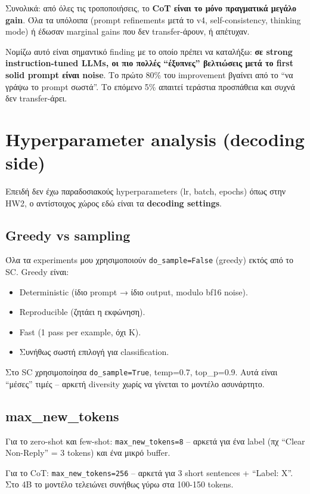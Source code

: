 \documentclass[12pt]{fphw}
\begin{document}
Συνολικά: από όλες τις τροποποιήσεις, το \textbf{CoT είναι το μόνο πραγματικά μεγάλο gain}. Όλα τα υπόλοιπα (prompt refinements μετά το v4, self-consistency, thinking mode) ή έδωσαν marginal gains που δεν transfer-άρουν, ή απέτυχαν.

Νομίζω αυτό είναι σημαντικό finding με το οποίο πρέπει να καταλήξω: \textbf{σε strong instruction-tuned LLMs, οι πιο πολλές ``έξυπνες'' βελτιώσεις μετά το first solid prompt είναι noise}. Το πρώτο 80\% του improvement βγαίνει από το ``να γράψω το prompt σωστά''. Το επόμενο 5\% απαιτεί τεράστια προσπάθεια και συχνά δεν transfer-άρει.

\section{Hyperparameter analysis (decoding side)}

Επειδή δεν έχω παραδοσιακούς hyperparameters (lr, batch, epochs) όπως στην HW2, ο αντίστοιχος χώρος εδώ είναι τα \textbf{decoding settings}.

\subsection{Greedy vs sampling}

Όλα τα experiments μου χρησιμοποιούν \texttt{do\_sample=False} (greedy) εκτός από το SC. Greedy είναι:

\begin{itemize}
    \item Deterministic (ίδιο prompt → ίδιο output, modulo bf16 noise).
    \item Reproducible (ζητάει η εκφώνηση).
    \item Fast (1 pass per example, όχι K).
    \item Συνήθως σωστή επιλογή για classification.
\end{itemize}

Στο SC χρησιμοποίησα \texttt{do\_sample=True}, temp=0.7, top\_p=0.9. Αυτά είναι ``μέσες'' τιμές -- αρκετή diversity χωρίς να γίνεται το μοντέλο ασυνάρτητο.

\subsection{max\_new\_tokens}

Για το zero-shot και few-shot: \texttt{max\_new\_tokens=8} -- αρκετά για ένα label (πχ ``Clear Non-Reply'' = 3 tokens) και ένα μικρό buffer.

Για το CoT: \texttt{max\_new\_tokens=256} -- αρκετά για 3 short sentences + ``Label: X''. Στο 4B το μοντέλο τελειώνει συνήθως γύρω στα 100-150 tokens.
\end{document}
